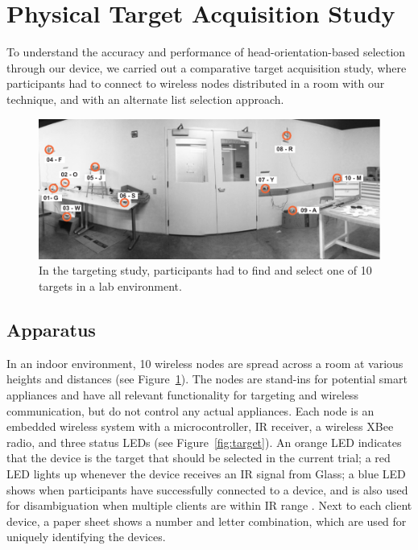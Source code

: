 \section{Physical Target Acquisition Study}
To understand the accuracy and performance of head-orientation-based  selection through our device, we carried out a comparative target acquisition study, where participants had to connect to wireless nodes distributed in a room with our technique, and with an alternate list selection approach.

\begin{figure}[t]
\centering
\includegraphics[width=1.0\columnwidth]{figures/targeting-study-layout.pdf}
\caption{In the targeting study, participants had to find and select one of 10 targets in a lab environment.}
\label{fig:targeting-study-layout}
\end{figure}

\subsection{Apparatus}
In an indoor environment, 10 wireless nodes are spread across a room at various heights and distances (see Figure~\ref{fig:targeting-study-layout}). The nodes are stand-ins for potential smart appliances and have all relevant functionality for targeting and wireless communication, but do not control any actual appliances. Each node is an embedded wireless system with a microcontroller, IR receiver, a wireless XBee radio, and three status LEDs (see Figure~\ref{fig:target}). An orange LED indicates that the device is the target that should be selected in the current trial; a red LED lights up whenever the device receives an IR signal from Glass; a blue LED shows when participants have successfully connected to a device, and is also used for disambiguation when multiple clients are within IR range . Next to each client device, a paper sheet shows a number and letter combination, which are used for uniquely identifying the devices. 


